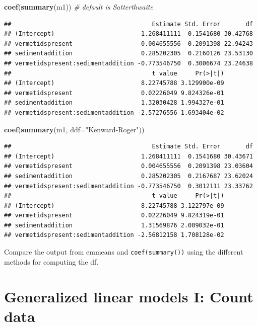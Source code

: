 \documentclass[]{book}
\newenvironment{Shaded}{\begin{snugshade}}{\end{snugshade}}
\newcommand{\CommentTok}[1]{\textcolor[rgb]{0.56,0.35,0.01}{\textit{#1}}}
\newcommand{\DataTypeTok}[1]{\textcolor[rgb]{0.13,0.29,0.53}{#1}}
\newcommand{\KeywordTok}[1]{\textcolor[rgb]{0.13,0.29,0.53}{\textbf{#1}}}
\newcommand{\NormalTok}[1]{#1}
\newcommand{\StringTok}[1]{\textcolor[rgb]{0.31,0.60,0.02}{#1}}
\begin{document}
\begin{Shaded}
\begin{Highlighting}[]
\KeywordTok{coef}\NormalTok{(}\KeywordTok{summary}\NormalTok{(m1)) }\CommentTok{# default is Satterthwaite}
\end{Highlighting}
\end{Shaded}

\begin{verbatim}
##                                       Estimate Std. Error       df
## (Intercept)                        1.268411111  0.1541680 30.42768
## vermetidspresent                   0.004655556  0.2091398 22.94243
## sedimentaddition                   0.285202305  0.2160126 23.53130
## vermetidspresent:sedimentaddition -0.773546750  0.3006674 23.24638
##                                       t value     Pr(>|t|)
## (Intercept)                        8.22745788 3.129900e-09
## vermetidspresent                   0.02226049 9.824326e-01
## sedimentaddition                   1.32030428 1.994327e-01
## vermetidspresent:sedimentaddition -2.57276556 1.693404e-02
\end{verbatim}

\begin{Shaded}
\begin{Highlighting}[]
\KeywordTok{coef}\NormalTok{(}\KeywordTok{summary}\NormalTok{(m1, }\DataTypeTok{ddf=}\StringTok{"Kenward-Roger"}\NormalTok{))}
\end{Highlighting}
\end{Shaded}

\begin{verbatim}
##                                       Estimate Std. Error       df
## (Intercept)                        1.268411111  0.1541680 30.43671
## vermetidspresent                   0.004655556  0.2091398 23.03604
## sedimentaddition                   0.285202305  0.2167687 23.62024
## vermetidspresent:sedimentaddition -0.773546750  0.3012111 23.33762
##                                       t value     Pr(>|t|)
## (Intercept)                        8.22745788 3.122797e-09
## vermetidspresent                   0.02226049 9.824319e-01
## sedimentaddition                   1.31569876 2.009032e-01
## vermetidspresent:sedimentaddition -2.56812158 1.708128e-02
\end{verbatim}

Compare the output from emmeans and \texttt{coef(summary())} using the different methods for computing the df.

\hypertarget{generalized-linear-models-i-count-data}{%
\chapter{Generalized linear models I: Count data}\label{generalized-linear-models-i-count-data}}
\end{document}
